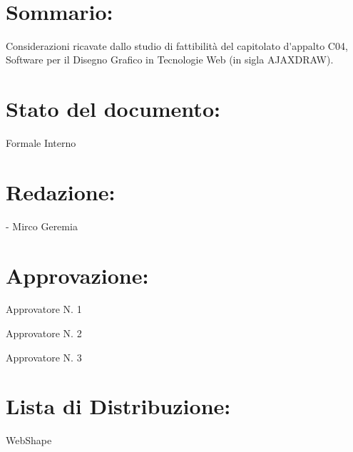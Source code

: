 \newpage

\begin{center} %
	\begin{Huge}	
				\textbf{\TITOLODOC}
			\\
	\end{Huge}
\end{center}

\section*{\Large Sommario:} %
\indent \indent
Considerazioni ricavate dallo studio di fattibilit\`{a} del capitolato d\'{}appalto C04, 
Software per il Disegno Grafico in Tecnologie Web (in sigla AJAXDRAW).


\section*{\Large Stato del documento:}
\indent \indent
	Formale Interno

\section*{\Large Redazione:}
	\begin{elencopuntato}[\normindent]
		\item[-] Mirco Geremia
	
	\end{elencopuntato}

\section*{\Large Approvazione:}
	\begin{elencopuntato}[\normindent]
		\item Approvatore N. 1
		\item Approvatore N. 2
		\item Approvatore N. 3
	\end{elencopuntato}

\section*{\LARGE Lista di Distribuzione:}

	\begin{elenconumerato}{\normindent}
		\item WebShape 
	\end{elenconumerato}

